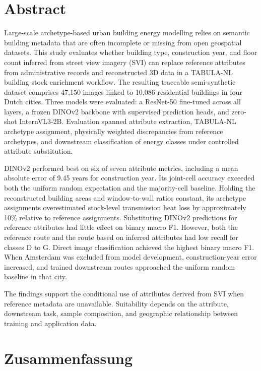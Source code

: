 \section*{Abstract}

Large-scale archetype-based urban building energy modelling relies on semantic building metadata that are often incomplete or missing from open geospatial datasets. This study evaluates whether building type, construction year, and floor count inferred from street view imagery (SVI) can replace reference attributes from administrative records and reconstructed 3D data in a TABULA-NL building stock enrichment workflow. The resulting traceable semi-synthetic dataset comprises 47,150 images linked to 10,086 residential buildings in four Dutch cities. Three models were evaluated: a ResNet-50 fine-tuned across all layers, a frozen DINOv2 backbone with supervised prediction heads, and zero-shot InternVL3-2B. Evaluation spanned attribute extraction, TABULA-NL archetype assignment, physically weighted discrepancies from reference archetypes, and downstream classification of energy classes under controlled attribute substitution.

DINOv2 performed best on six of seven attribute metrics, including a mean absolute error of 9.45 years for construction year. Its joint-cell accuracy exceeded both the uniform random expectation and the majority-cell baseline. Holding the reconstructed building areas and window-to-wall ratios constant, its archetype assignments overestimated stock-level transmission heat loss by approximately 10\% relative to reference assignments. Substituting DINOv2 predictions for reference attributes had little effect on binary macro F1. However, both the reference route and the route based on inferred attributes had low recall for classes D to G. Direct image classification achieved the highest binary macro F1. When Amsterdam was excluded from model development, construction-year error increased, and trained downstream routes approached the uniform random baseline in that city.

The findings support the conditional use of attributes derived from SVI when reference metadata are unavailable. Suitability depends on the attribute, downstream task, sample composition, and geographic relationship between training and application data.

\newpage
\section*{Zusammenfassung}

